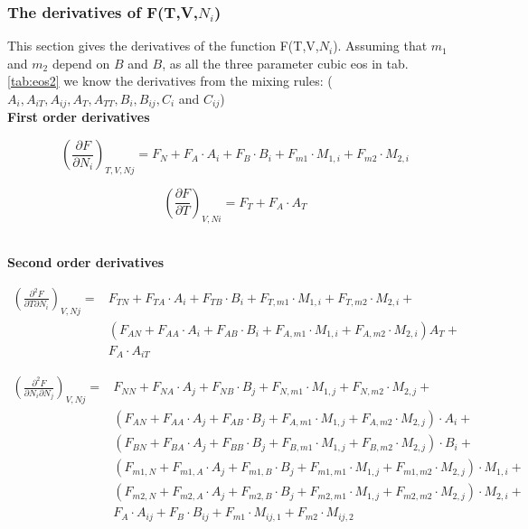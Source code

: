 \documentclass[a4paper, 12pt, english, sintefheadings, sintefcolour]{sintefmemo}
\begin{document}
\newpage
\subsubsection{ The derivatives of F(T,V,$N_i$)}
This section gives the derivatives of the function F(T,V,$N_i$). Assuming that $m_1$ and $m_2$ depend on $B$ and $B$, as all the three parameter cubic eos in tab. \ref{tab:eos2} we know the derivatives from the mixing rules: ($A_i, A_{iT}, A_{ij}, A_T, A_{TT}, B_i, B_{ij}, C_i$ and $C_{ij}$)\\

\textbf{First order derivatives}

\noindent\hrulefill

\begin{equation}
\left(\frac{\partial F}{\partial N_i}\right)_{T,V,Nj}=F_N+F_A\cdot A_i+F_B\cdot B_i+F_{m1}\cdot M_{1,i}+F_{m2}\cdot M_{2,i} 
\end{equation}

\noindent\hrulefill

\begin{equation}
\left(\frac{\partial F}{\partial T}\right)_{V,Ni}=F_T+F_A\cdot A_T
\end{equation} 

\noindent\hrulefill\\

\textbf{Second order derivatives}

\noindent\hrulefill

\begin{equation}
\begin{split}
\left(\frac{\partial^2 F}{\partial T \partial N_i}\right)_{V,Nj}=&F_{TN} +F_{TA}\cdot A_i+F_{TB}\cdot B_i+F_{T,m1}\cdot M_{1,i}+F_{T,m2}\cdot M_{2,i}+ \\
& \left(F_{AN}+F_{AA}\cdot A_i+F_{AB}\cdot B_i+F_{A,m1}\cdot M_{1,i}+F_{A,m2}\cdot M_{2,i}\right)A_T+\\
&F_A\cdot A_{iT}
\end{split}
\end{equation} 

\noindent\hrulefill

\begin{equation}
\begin{split}
\left(\frac{\partial^2 F}{\partial N_i \partial N_j}\right)_{V,Nj}=&F_{NN}+F_{NA}\cdot A_{j}+F_{NB}\cdot B_j+F_{N,m1}\cdot M_{1,j}+F_{N,m2}\cdot M_{2,j}+ \\
& \left(F_{AN}+F_{AA}\cdot A_j+F_{AB}\cdot B_j+F_{A,m1}\cdot M_{1,j}+F_{A,m2}\cdot M_{2,j}\right)\cdot A_i+\\
& \left(F_{BN}+F_{BA}\cdot A_j+F_{BB}\cdot B_j+F_{B,m1}\cdot M_{1,j}+F_{B,m2}\cdot M_{2,j}\right)\cdot B_i+\\
& \left(F_{m1,N}+F_{m1,A}\cdot A_j+F_{m1,B}\cdot B_j+F_{m1,m1}\cdot M_{1,j}+F_{m1,m2}\cdot M_{2,j}\right)\cdot M_{1,i}+\\
& \left(F_{m2,N}+F_{m2,A}\cdot A_j+F_{m2,B}\cdot B_j+F_{m2,m1}\cdot M_{1,j}+F_{m2,m2}\cdot M_{2,j}\right)\cdot M_{2,i}+\\
& F_{A}\cdot A_{ij}+F_{B}\cdot B_{ij}+F_{m1}\cdot M_{ij,1}+F_{m2 }\cdot M_{ij,2}
\end{split}
\end{equation} 
\end{document}
